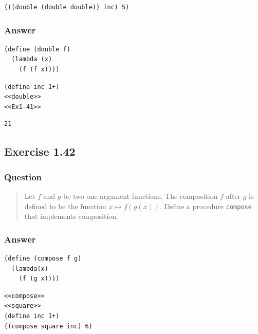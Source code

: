 \documentclass[final,fleqn,titlepage,twoside]{article}
\begin{document}
\begin{verbatim}
(((double (double double)) inc) 5)
\end{verbatim}

\subsubsection{Answer}
\label{sec:org8ff7d91}
\begin{verbatim}
(define (double f)
  (lambda (x)
    (f (f x))))
\end{verbatim}

\begin{verbatim}
(define inc 1+)
<<double>>
<<Ex1-41>>
\end{verbatim}

\begin{verbatim}
21
\end{verbatim}

\subsection{Exercise 1.42}
\label{sec:org8e417cf}
\subsubsection{Question}
\label{sec:orgc91c619}
\begin{quote}
Let \(f\) and \(g\) be two one-argument functions. The composition \(f\) after
\(g\) is defined to be the function \(x \mapsto f(g(x))\). Define a procedure
\texttt{compose} that implements composition.
\end{quote}

\subsubsection{Answer}
\label{sec:orgd403cce}
\begin{verbatim}
(define (compose f g)
  (lambda(x)
    (f (g x))))
\end{verbatim}

\begin{verbatim}
<<compose>>
<<square>>
(define inc 1+)
((compose square inc) 6)
\end{verbatim}
\end{document}
